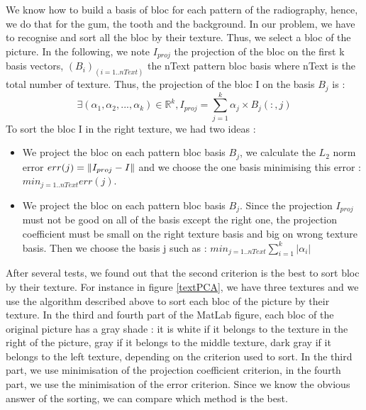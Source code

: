 We know how to build a basis of bloc for each pattern of the radiography, hence, we do that for the gum, the tooth and the background. In our problem, we have to recognise and sort all the bloc by their texture. Thus, we select a bloc of the picture. In the following, we note $I_{proj}$ the projection of the bloc on the first k basis vectors, $(B_{i})_{(i=1..nText)}$ the nText pattern bloc basis where nText is the total number of texture. Thus, the projection of the bloc I on the basis $B_{j}$ is :
\begin{equation}
\exists (\alpha_{1},\alpha_{2},...,\alpha_{k}) \in \mathbb{R}^k , I_{proj} = \sum_{j=1}^{k} \alpha_{j} \times B_{j}(:,j) 
\label{proj_I}
\end{equation}
To sort the bloc I in the right texture, we had two ideas :
\begin{itemize}
\item We project the bloc on each pattern bloc basis $B_{j}$, we calculate the $L_{2}$ norm error $err(j) = \left\lVert I_{proj}-I\right\rVert$ and we choose the one basis minimising this error : $min_{j=1 .. nText} err(j)$.
\item We project the bloc on each pattern bloc basis $B_{j}$. Since the projection $I_{proj}$ must not be good on all of the basis except the right one, the projection coefficient must be small on the right texture basis and big on wrong texture basis. Then we choose the basis j such as :  $min_{j=1 .. nText} \sum_{i=1}^{k} |\alpha_{i}|$
\end{itemize}
After several tests, we found out that the second criterion is the best to sort bloc by their texture. For instance in figure \ref{textPCA}, we have three textures and we use the algorithm described above to sort each bloc of the picture by their texture. In the third and fourth part of the MatLab figure, each bloc of the original picture has a gray shade : it is white if it belongs to the texture in the right of the picture, gray if it belongs to the middle texture, dark gray if it belongs to the left texture, depending on the criterion used to sort. In the third part, we use minimisation of the projection coefficient criterion, in the fourth part, we use the minimisation of the error criterion. Since we know the obvious answer of the sorting, we can compare which method is the best.  
